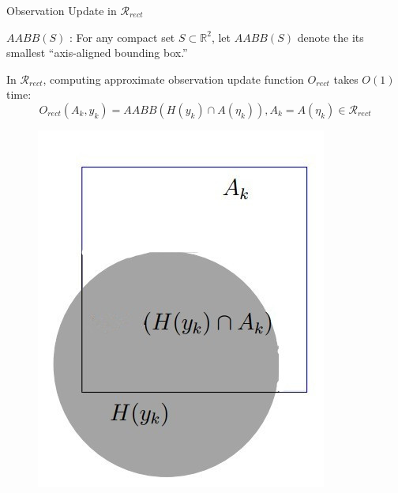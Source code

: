 \begin{frame}{Observation Update in $\mathcal{R}_{rect}$}
\begin{definition}{\textbf{$AABB(S)$} :}
    For any compact set $S \subset \mathbb{R}^2$, let $AABB(S)$
	denote the its smallest	``axis-aligned bounding box.''
\end{definition}

In $\mathcal{R}_{rect}$, computing approximate observation update function $O_{rect}$ takes $O(1)$ time:\\
$$ O_{rect}(A_k, y_k) = AABB(H(y_k) \cap A(\eta_k)), A_k = A(\eta_k) \in \mathcal{R}_{rect}$$

\begin{figure}
    \includegraphics[scale=0.27]{figs/circlerect_1.jpg}
    \end{figure}
 
\end{frame}

